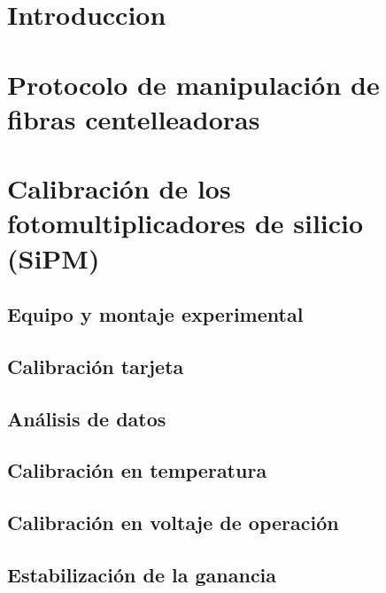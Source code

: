 \documentclass[11pt,a4paper]{article}
\begin{document}


\tableofcontents
\newpage


\section{Introduccion}  \label{sec:ch01}


\newpage
\section{Protocolo de manipulación de fibras centelleadoras} \label{sec:ch03}


\newpage
\section{Calibración de los fotomultiplicadores de silicio (SiPM)} \label{sec:ch02}

	\subsection{Equipo y montaje experimental}
	
	
	\subsection{Calibración tarjeta}
	
	
	\subsection{Análisis de datos}
	
	
	\subsection{Calibración en temperatura}
	

	\subsection{Calibración en voltaje de operación}
	
	
	\subsection{Estabilización de la ganancia}
	
\end{document}

